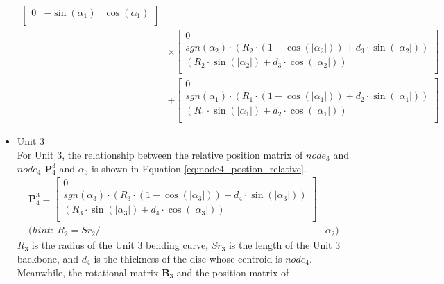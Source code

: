 \begin{itemize}
\begin{align}
\begin{bmatrix}
            0 & -\sin(\alpha_1) & \cos(\alpha_1) \\
        \end{bmatrix} \nonumber \\
        &\times
        \begin{bmatrix}
            0 \\
            sgn(\alpha_2)\cdot(R_2\cdot(1-\cos(\left|\alpha_2\right|)) + d_3\cdot \sin(\left|\alpha_2\right|)) \\
            (R_2\cdot \sin(\left|\alpha_2\right|) + d_3\cdot \cos(\left|\alpha_2\right|)) \\
        \end{bmatrix} \nonumber \\
        &+
        \begin{bmatrix}
            0 \\
            sgn(\alpha_1)\cdot(R_1\cdot(1-\cos(\left|\alpha_1\right|)) + d_2\cdot \sin(\left|\alpha_1\right|)) \\
            (R_1\cdot \sin(\left|\alpha_1\right|) + d_2\cdot \cos(\left|\alpha_1\right|)) \\
        \end{bmatrix}
        \label{eq:node3_position_absolute}
    \end{align}
    \item Unit 3 \\
    For Unit 3, the relationship between the relative position matrix of $node_3$ and $node_4$ $\textbf{P}_{4}^{3}$ and 
    $\alpha_3$ is shown in Equation \ref{eq:node4_postion_relative}.
    \begin{align}
        \textbf{P}_{4}^{3} = 
        \begin{bmatrix}
            0 \\
            sgn(\alpha_3)\cdot(R_3\cdot(1-\cos(\left|\alpha_3\right|)) + d_4\cdot \sin(\left|\alpha_3\right|)) \\
            (R_3\cdot \sin(\left|\alpha_3\right|) + d_4\cdot \cos(\left|\alpha_3\right|)) \\
        \end{bmatrix}&
        \label{eq:node4_postion_relative} \\
        \nonumber (hint: \ R_2 = {Sr}_2/ &\alpha_2)
    \end{align}
    $R_3$ is the radius of the Unit 3 bending curve, ${Sr}_3$ is the length of the Unit 3 backbone, and $d_4$ is the thickness 
    of the disc whose centroid is $node_4$. Meanwhile, the rotational matrix $\textbf{B}_{3}$ and the position matrix of 

\end{itemize}
